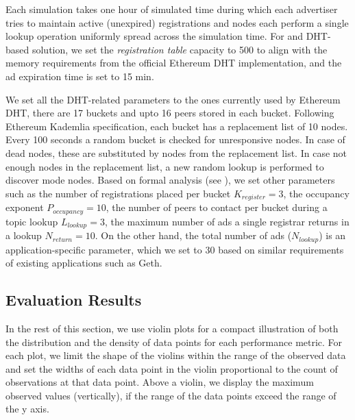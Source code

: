 Each simulation takes one hour of simulated time during which each advertiser tries to maintain active (\ie unexpired) registrations and nodes each perform a single lookup operation uniformly spread across the simulation time.  For \sysname and DHT-based solution, we set the \emph{registration table} capacity to 500 to align with the memory requirements from the official Ethereum DHT implementation, and the ad expiration time is set to 15 min. %

We set all the DHT-related parameters to the ones currently used by Ethereum DHT, \ie there are 17 buckets and upto 16 peers stored in each bucket.
Following Ethereum Kademlia specification,  each bucket has a replacement list of 10 nodes. 
Every 100 seconds a random bucket is checked for unresponsive nodes. 
In case of dead nodes, these are substituted by nodes from the replacement list.  In case not enough nodes in the replacement list,  a new random lookup is performed to discover mode nodes.
Based on formal analysis (see ), we set other \sysname parameters such as the number of registrations placed per bucket $K_{register}= 3$, the occupancy exponent $P_{occupancy} = 10$, the number of peers to contact per bucket during a topic lookup $L_\textit{lookup}=3$, the maximum number of ads a single registrar returns in a lookup $N_\textit{return}=10$. On the other hand, the total number of ads (\ie $N_\textit{lookup}$) is an application-specific parameter, which we set to 30 based on similar requirements of existing applications such as Geth.


\subsection{Evaluation Results}

In the rest of this section, we use violin plots for a compact illustration of both the distribution and the density of data points for each performance metric. For each plot, we limit the shape of the violins within the range of the observed data and set the widths of each data point in the violin proportional to the count of observations at that data point. 
Above a violin, we display the maximum observed values (vertically), if the range of the data points exceed the range of the y axis. 

